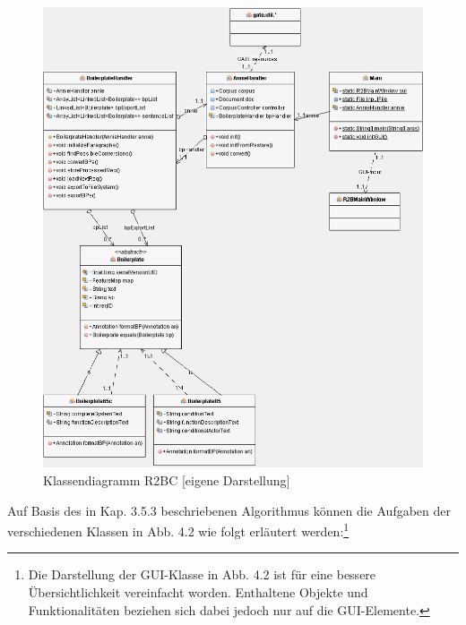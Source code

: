 \documentclass[12pt]{report}
\begin{document}
\begin{figure}[h!]
\begin{center}
\includegraphics[scale=0.6]{Bilder/r2bc-klassen.png}
\caption{Klassendiagramm R2BC [eigene Darstellung]}
\end{center}
\end{figure}

Auf Basis des in Kap. 3.5.3 beschriebenen Algorithmus können die Aufgaben der verschiedenen Klassen in Abb. 4.2 wie folgt erläutert werden:\footnote{Die Darstellung der GUI-Klasse in Abb. 4.2 ist für eine bessere Übersichtlichkeit vereinfacht worden. Enthaltene Objekte und Funktionalitäten beziehen sich dabei jedoch nur auf die GUI-Elemente.}
\end{document}
